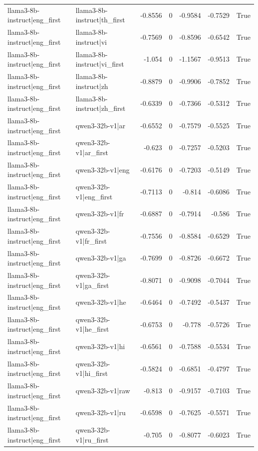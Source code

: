 \begin{table}
\begin{tabular}{l l r r r r l}
llama3-8b-instruct|eng_first & llama3-8b-instruct|th_first & -0.8556 & 0 & -0.9584 & -0.7529 & True \\
llama3-8b-instruct|eng_first & llama3-8b-instruct|vi & -0.7569 & 0 & -0.8596 & -0.6542 & True \\
llama3-8b-instruct|eng_first & llama3-8b-instruct|vi_first & -1.054 & 0 & -1.1567 & -0.9513 & True \\
llama3-8b-instruct|eng_first & llama3-8b-instruct|zh & -0.8879 & 0 & -0.9906 & -0.7852 & True \\
llama3-8b-instruct|eng_first & llama3-8b-instruct|zh_first & -0.6339 & 0 & -0.7366 & -0.5312 & True \\
llama3-8b-instruct|eng_first & qwen3-32b-v1|ar & -0.6552 & 0 & -0.7579 & -0.5525 & True \\
llama3-8b-instruct|eng_first & qwen3-32b-v1|ar_first & -0.623 & 0 & -0.7257 & -0.5203 & True \\
llama3-8b-instruct|eng_first & qwen3-32b-v1|eng & -0.6176 & 0 & -0.7203 & -0.5149 & True \\
llama3-8b-instruct|eng_first & qwen3-32b-v1|eng_first & -0.7113 & 0 & -0.814 & -0.6086 & True \\
llama3-8b-instruct|eng_first & qwen3-32b-v1|fr & -0.6887 & 0 & -0.7914 & -0.586 & True \\
llama3-8b-instruct|eng_first & qwen3-32b-v1|fr_first & -0.7556 & 0 & -0.8584 & -0.6529 & True \\
llama3-8b-instruct|eng_first & qwen3-32b-v1|ga & -0.7699 & 0 & -0.8726 & -0.6672 & True \\
llama3-8b-instruct|eng_first & qwen3-32b-v1|ga_first & -0.8071 & 0 & -0.9098 & -0.7044 & True \\
llama3-8b-instruct|eng_first & qwen3-32b-v1|he & -0.6464 & 0 & -0.7492 & -0.5437 & True \\
llama3-8b-instruct|eng_first & qwen3-32b-v1|he_first & -0.6753 & 0 & -0.778 & -0.5726 & True \\
llama3-8b-instruct|eng_first & qwen3-32b-v1|hi & -0.6561 & 0 & -0.7588 & -0.5534 & True \\
llama3-8b-instruct|eng_first & qwen3-32b-v1|hi_first & -0.5824 & 0 & -0.6851 & -0.4797 & True \\
llama3-8b-instruct|eng_first & qwen3-32b-v1|raw & -0.813 & 0 & -0.9157 & -0.7103 & True \\
llama3-8b-instruct|eng_first & qwen3-32b-v1|ru & -0.6598 & 0 & -0.7625 & -0.5571 & True \\
llama3-8b-instruct|eng_first & qwen3-32b-v1|ru_first & -0.705 & 0 & -0.8077 & -0.6023 & True \\

\end{tabular}
\end{table}
